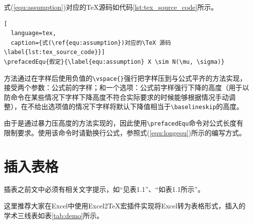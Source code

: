 
式(\ref{equ:assumption})对应的\TeX 源码如代码\ref{lst:tex_source_code}所示。

\begin{lstlisting}[
  language=tex, 
  caption={式(\ref{equ:assumption})对应的\TeX 源码\label{lst:tex_source_code}}]
\prefacedEqu{假定}{\label{equ:assumption} X \sim N(\mu, \sigma)}
\end{lstlisting}

方法通过在字样后使用负值的\texttt{\textbackslash vspace\{\}}强行把字样压到与公式平齐的方法实现，接受两个参数：公式前的字样；和一个选项：公式前字样强行下降的高度（用于以防命令在某些情况下字样下降高度不符合实际要求的时候能够根据情况手动调整），在不给出选项值的情况下字样将默认下降值相当于\texttt{\textbackslash baselineskip}的高度。

由于是通过暴力压高度的方法实现的，因此使用\texttt{\textbackslash prefacedEqu}命令对公式长度有限制要求。使用该命令时请勤换行公式，参照式(\ref{equ:longequ})所示的编写方式。


\section{插入表格}

插表之前文中必须有相关文字提示，如“见表1.1”、“如表1.1所示”。

这里推荐大家在Excel中使用Excel2TeX宏插件实现将Excel转为表格形式，插入的学术三线表如表\ref{tab:demo}所示。


